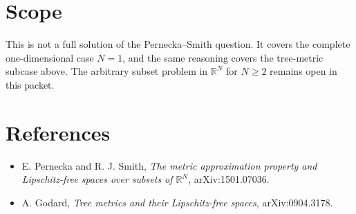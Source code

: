 \documentclass[11pt]{article}
\newcommand{\R}{\mathbb R}
\begin{document}
\section*{Scope}

This is not a full solution of the Pernecka--Smith question.  It covers the
complete one-dimensional case \(N=1\), and the same reasoning covers the
tree-metric subcase above.  The arbitrary subset problem in \(\R^N\) for
\(N\ge 2\) remains open in this packet.

\section*{References}

\begin{itemize}
\item E. Pernecka and R. J. Smith, \emph{The metric approximation property and
Lipschitz-free spaces over subsets of \(\R^N\)}, arXiv:1501.07036.
\item A. Godard, \emph{Tree metrics and their Lipschitz-free spaces},
arXiv:0904.3178.
\end{itemize}
\end{document}
